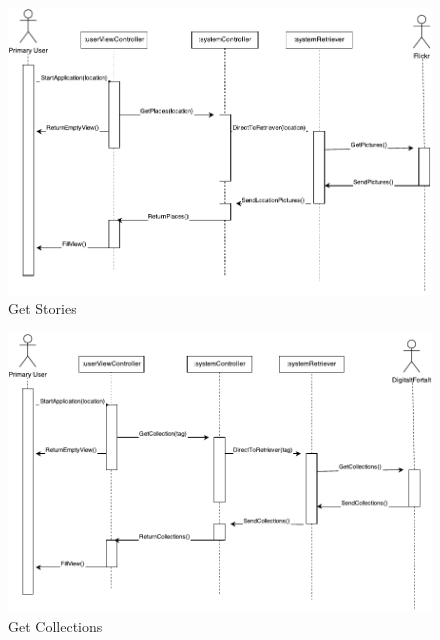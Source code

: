 \begin{figure}[!h]
\begin{center}
\includegraphics[scale=1]{Get-Stories}
\caption{Get Stories}
\end{center}
\end{figure}

\begin{figure}[!h]
\begin{center}
\includegraphics[scale=1]{Get-Collections}
\caption{Get Collections}
\end{center}
\end{figure}